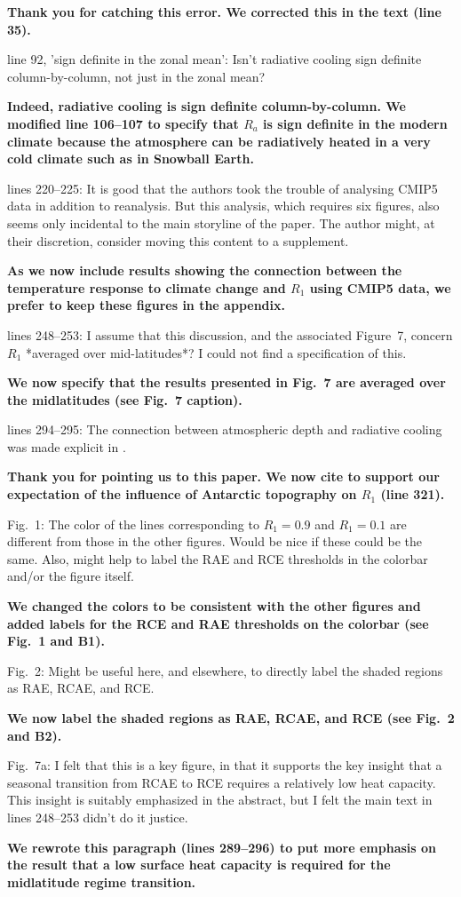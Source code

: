\documentclass{article}
\begin{document}
\textbf{Thank you for catching this error. We corrected this in the text (line 35).}

line 92, 'sign definite in the zonal mean': Isn't radiative cooling sign definite column-by-column, not just in the zonal mean?

\textbf{Indeed, radiative cooling is sign definite column-by-column. We modified line 106--107 to specify that $R_a$ is sign definite in the modern climate because the atmosphere can be radiatively heated in a very cold climate such as in Snowball Earth.}

lines 220--225: It is good that the authors took the trouble of analysing CMIP5 data in addition to reanalysis. But this analysis, which requires six figures, also seems only incidental to the main storyline of the paper. The author might, at their discretion, consider moving this content to a supplement.

\textbf{As we now include results showing the connection between the temperature response to climate change and $R_1$ using CMIP5 data, we prefer to keep these figures in the appendix.}

lines 248--253: I assume that this discussion, and the associated Figure~7, concern $R_1$ *averaged over mid-latitudes*? I could not find a specification of this.

\textbf{We now specify that the results presented in Fig.~7 are averaged over the midlatitudes (see Fig.~7 caption).}

lines 294--295: The connection between atmospheric depth and radiative cooling was made explicit in \cite{jeevanjee2018}.

\textbf{Thank you for pointing us to this paper. We now cite \cite{jeevanjee2018} to support our expectation of the influence of Antarctic topography on $R_1$ (line 321).}

Fig.~1: The color of the lines corresponding to $R_1=0.9$ and $R_1=0.1$ are different from those in the other figures. Would be nice if these could be the same. Also, might help to label the RAE and RCE thresholds in the colorbar and/or the figure itself.

\textbf{We changed the colors to be consistent with the other figures and added labels for the RCE and RAE thresholds on the colorbar (see Fig.~1 and B1).}

Fig.~2: Might be useful here, and elsewhere, to directly label the shaded regions as RAE, RCAE, and RCE.

\textbf{We now label the shaded regions as RAE, RCAE, and RCE (see Fig.~2 and B2).}

Fig.~7a: I felt that this is a key figure, in that it supports the key insight that a seasonal transition from RCAE to RCE requires a relatively low heat capacity. This insight is suitably emphasized in the abstract, but I felt the main text in lines 248--253 didn't do it justice.

\textbf{We rewrote this paragraph (lines 289--296) to put more emphasis on the result that a low surface heat capacity is required for the midlatitude regime transition.}




\end{document}

